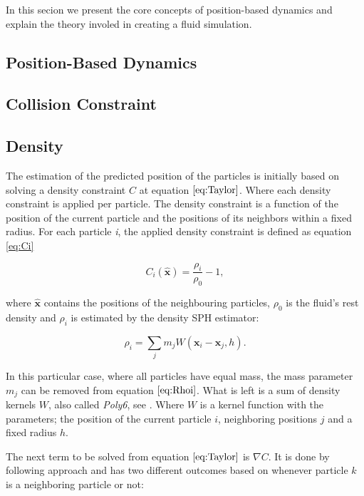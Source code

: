 In this secion we present the core concepts of position-based dynamics and
explain the theory involed in creating a fluid simulation.

\subsection{Position-Based Dynamics}



\subsection{Collision Constraint}


\subsection{Density}

The estimation of the predicted position of the particles is initially based on
solving a density constraint $C$ at equation $\ref{eq:Taylor}$. Where each
density constraint is applied per particle. The density constraint is a
function of the position of the current particle and the positions of its
neighbors within a fixed radius. For each particle \textit{i}, the applied
density constraint is defined as equation \ref{eq:Ci}

\begin{equation}
\label{eq:Ci}
C_i(\hat{\mathbf{x}}) = \frac{\rho_i}{\rho_0} - 1,
\end{equation}

where $\hat{\mathbf{x}}$ contains the positions of the neighbouring particles,
$\rho_0$ is the fluid's rest density and $\rho_i$ is estimated by the density
SPH estimator:

\begin{equation}
\label{eq:Rhoi}
\rho_i = \sum\limits_{j} m_j W(\mathbf{x}_i - \mathbf{x}_j, h).
\end{equation}

In this particular case, where all particles have equal mass, the mass
parameter $m_j$ can be removed from equation $\ref{eq:Rhoi}$. What is left is a
sum of density kernels $W$, also called \textit{Poly6}, see
\cite{muller2003particle}. Where $W$ is a kernel function with the parameters;
the position of the current particle  $i$, neighboring positions $j$ and a
fixed radius $h$.

The next term to be solved from equation $\ref{eq:Taylor}$ is $\nabla C$. It is
done by following \cite{macklin2013position} approach and has two different
outcomes based on whenever particle $k$ is a neighboring particle or not:

